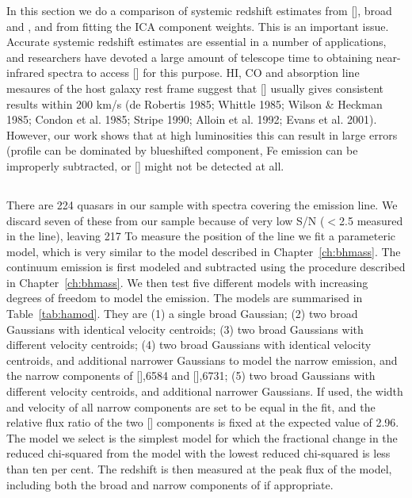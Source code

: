 In this section we do a comparison of systemic redshift estimates from [], broad \hb and \hans, and from fitting the \ac{ICA} component weights. 
This is an important issue. 
Accurate systemic redshift estimates are essential in a number of applications, and researchers have devoted a large amount of telescope time to obtaining near-infrared spectra to access [] for this purpose. 
HI, CO and absorption line mesaures of the host galaxy rest frame suggest that [] usually gives consistent results within 200 km/s (de Robertis 1985; Whittle 1985; Wilson \& Heckman 1985; Condon et al. 1985; Stripe 1990; Alloin et al. 1992; Evans et al. 2001).  
However, our work shows that at high luminosities this can result in large errors (profile can be dominated by blueshifted component, Fe emission can be improperly subtracted, or [] might not be detected at all. 

\subsection{\hans}

There are 224 quasars in our sample with spectra covering the \ha emission line. 
We discard seven of these from our sample because of very low \ac{S/N} ($<$2.5 measured in the \ha line), leaving 217
To measure the position of the line we fit a parameteric model, which is very similar to the model described in Chapter~\ref{ch:bhmass}. 
The continuum emission is first modeled and subtracted using the procedure described in Chapter~\ref{ch:bhmass}. 
We then test five different models with increasing degrees of freedom to model the \ha emission. 
The models are summarised in Table~\ref{tab:hamod}. 
They are (1) a single broad Gaussian; (2) two broad Gaussians with identical velocity centroids; (3) two broad Gaussians with different velocity centroids; (4) two broad Gaussians with identical velocity centroids, and additional narrower Gaussians to model the narrow \ha emission, and the narrow components of [],6584 and [],6731; (5) two broad Gaussians with different velocity centroids, and additional narrower Gaussians. 
If used, the width and velocity of all narrow components are set to be equal in the fit, and the relative flux ratio of the two [] components is fixed at the expected value of 2.96.
The model we select is the simplest model for which the fractional change in the reduced chi-squared from the model with the lowest reduced chi-squared is less than ten per cent. 
The redshift is then measured at the peak flux of the \ha model, including both the broad and narrow components of \ha if appropriate. 

